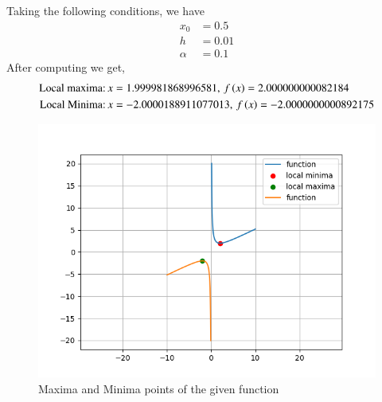 \documentclass[journal]{IEEEtran}
\begin{document}
Taking the following conditions, we have
\begin{align}
    x_0 &= 0.5\\
    h &= 0.01\\
    \alpha &=0.1
\end{align}
After computing we get,
\begin{align}
    \text{Local maxima:}\, x&=1.999981868996581,\,f\left(x\right) = 2.000000000082184\\
    \text{Local Minima:}\, x&=-2.0000188911077013,\,f\left(x\right) = -2.0000000000892175
\end{align}

\begin{figure}[H]
    \centering
    \includegraphics[width=\columnwidth]{figs/plot.png}
    \caption{Maxima and Minima points of the given function}
    \label{fig:Plot1}
    \end{figure}
\end{document}
